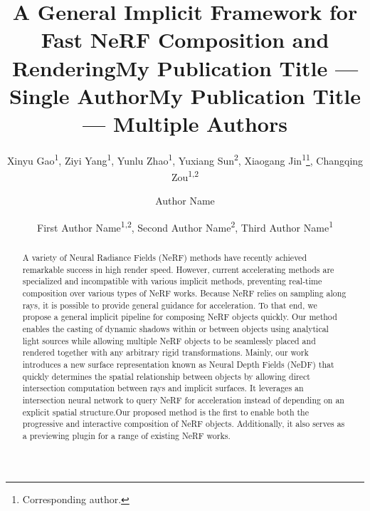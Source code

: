 \documentclass[letterpaper]{article} %
\title{A General Implicit Framework for Fast NeRF Composition and Rendering}
\author{
    Xinyu Gao\textsuperscript{\rm 1},
    Ziyi Yang\textsuperscript{\rm 1},
    Yunlu Zhao\textsuperscript{\rm 1},
    Yuxiang Sun\textsuperscript{\rm 2},
    Xiaogang Jin\textsuperscript{\rm 1}\thanks{Corresponding author.},
    Changqing Zou\textsuperscript{\rm 1,2}
}
\title{My Publication Title --- Single Author}
\author {
    Author Name
}
\title{My Publication Title --- Multiple Authors}
\author {
    First Author Name\textsuperscript{\rm 1,\rm 2},
    Second Author Name\textsuperscript{\rm 2},
    Third Author Name\textsuperscript{\rm 1}
}
\begin{document}
\maketitle

\begin{abstract}
A variety of Neural Radiance Fields (NeRF) methods have recently achieved remarkable success in high render speed.
However, current accelerating methods are specialized and incompatible with various implicit methods, preventing real-time composition over various types of NeRF works. Because NeRF relies on sampling along rays, it is possible to provide general guidance for acceleration. To that end, we propose a general implicit pipeline for composing NeRF objects quickly.
Our method enables the casting of dynamic shadows within or between objects using analytical light sources while allowing multiple NeRF objects to be seamlessly placed and rendered together with any arbitrary rigid transformations. Mainly, our work introduces a new surface representation known as Neural Depth Fields (NeDF) that quickly determines the spatial relationship between objects by allowing direct intersection computation between rays and implicit surfaces. It leverages an intersection neural network to query NeRF for acceleration instead of depending on an explicit spatial structure.Our proposed method is the first to enable both the progressive and interactive composition of NeRF objects. Additionally, it also serves as a previewing plugin for a range of existing NeRF works.
\end{abstract}
\end{document}
